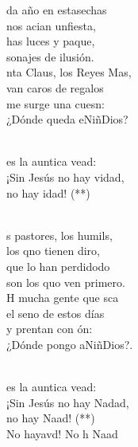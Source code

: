\documentclass[12pt]{article}
\begin{document}
\begin{multicols*}{2}
\begin{cancion}%
	da año en estasechas\\
	nos acian unfiesta,\\
	has luces y paque,\\
	sonajes de ilusión.\\
	nta Claus, los Reyes Mas,\\
	van caros de regalos\\
	me surge una cuesn: \\
	¿Dónde queda eNiñDios? \\\jump\\
	\begin{chorus}%
	es la auntica vead:\\
	¡Sin Jesús no hay vidad, \\
	no hay idad! (**)\\
	\end{chorus}%
	\jump\\
	s pastores, los humils,\\
	los qno tienen diro,\\
	 que lo han perdidodo\\
	son los quo ven primero.\\
	H mucha gente que sca\\
	el seno de estos días\\
	y prentan con ón:\\
	¿Dónde pongo aNiñDios?. \\\jump\\
	\begin{chorus}%
	es la auntica vead:\\
	¡Sin Jesús no hay Nadad, \\
	no hay Naad! (**)\\
	No hayavd! No h Naad\\
	\end{chorus}%
	\jump\\
\end{cancion}%


\end{multicols*}
\end{document}
